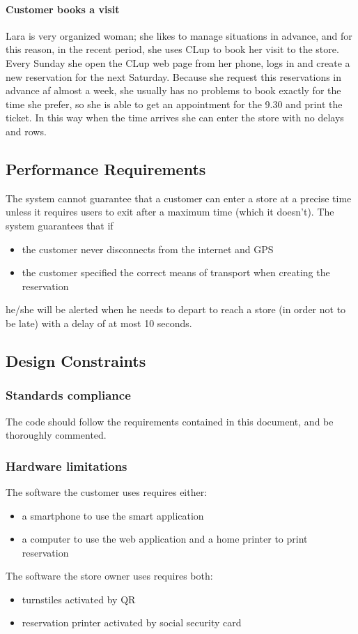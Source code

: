 \paragraph{Customer books a visit}
Lara is very organized woman; she likes to manage situations in advance, and for this reason, in the recent period, she uses CLup to book her visit to the store. Every Sunday she open the CLup web page from her phone, logs in and create a new reservation for the next Saturday. Because she request this reservations in advance af almost a week, she usually has no problems to book exactly for the time she prefer, so she is able to get an appointment for the 9.30 and print the ticket. In this way when the time arrives she can enter the store with no delays and rows.
\subsection{Performance Requirements}
The system cannot guarantee that a customer can enter a store at a precise time unless it requires users to exit after a maximum time (which it doesn't).
The system guarantees that if
\begin{itemize}
	\item the customer never disconnects from the internet and GPS
	\item the customer specified the correct means of transport when creating the reservation
\end{itemize}
 he/she will be alerted when he needs to depart to reach a store (in order not to be late) with a delay of at most 10 seconds.
\subsection{Design Constraints}
\subsubsection{Standards compliance}
The code should follow the requirements contained in this document, and be thoroughly commented.
\subsubsection{Hardware limitations}
The software the customer uses requires either:
\begin{itemize}
	\item a smartphone to use the smart application
	\item a computer to use the web application and a home printer to print reservation
\end{itemize}
The software the store owner uses requires both:
\begin{itemize}
	\item turnstiles activated by QR
	\item reservation printer activated by social security card
\end{itemize}
